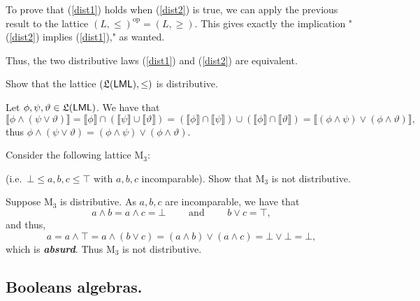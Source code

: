 \documentclass[fontsize=16pt,a4paper,DIV=17,parskip=half]{scrartcl}
\renewcommand{\mathsf}[1]{\textup{\textsf{#1}}}
\theoremstyle{definition}
\begin{document}
  To prove that (\ref{dist1}) holds when (\ref{dist2}) is true, we can apply the previous result to the lattice $(L, \le)^\mathrm{op} = (L, \ge)$.
  This gives exactly the implication "(\ref{dist2}) implies (\ref{dist1})," as wanted.

  Thus, the two distributive laws (\ref{dist1}) and (\ref{dist2}) are equivalent.

  \begin{que}
    Show that the lattice $(\mathfrak L(\mathsf{LML}), \le)$ is distributive.
  \end{que}

  Let $\phi, \psi, \vartheta \in \mathfrak{L}(\mathsf{LML})$.
  We have that \[
    \textstyle
  \llbracket \phi \land (\psi \lor \vartheta) \rrbracket 
  = \llbracket \phi\rrbracket \cap (\llbracket \psi\rrbracket \cup \llbracket \vartheta\rrbracket)  
  = (\llbracket \phi\rrbracket \cap \llbracket \psi\rrbracket) \cup (\llbracket \phi\rrbracket \cap \llbracket \vartheta\rrbracket)  
  = \llbracket (\phi \land \psi) \lor (\phi \land \vartheta)\rrbracket 
  ,\] 
  thus $\phi \land (\psi \lor \vartheta) = (\phi \land \psi) \lor (\phi \land \vartheta)$.

  \begin{que}
    Consider the following lattice $\mathrm{M}_3$:
    \begin{figure}[H]
      \centering
    \end{figure}
    (\textup{i.e.}\ $\bot \le a, b, c \le \top$ with $a,b,c$ incomparable).
    Show that $\mathrm{M_3}$ is not distributive.
  \end{que}

  Suppose $\mathrm{M_3}$ is distributive.
  As $a, b, c$ are incomparable, we have that 
   \[
  a \wedge b = a \wedge c = \bot \quad\quad \text{ and }\quad\quad b \vee c = \top
  ,\]
  and thus,
  \[
  a = a \wedge \top = a \wedge (b \vee c) = (a \wedge b) \vee (a \wedge c) = \bot \vee \bot = \bot
  ,\] 
  which is \textit{\textbf{absurd}}.
  Thus $\mathrm{M_3}$ is not distributive.

  \subsection{Booleans algebras.}
\end{document}
